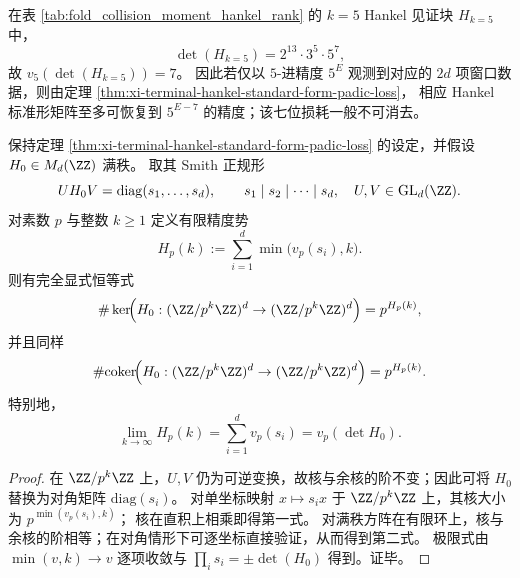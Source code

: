 \begin{corollary}[\texorpdfstring{$p=5$}{p=5} 的刚性阈值：七位损耗的不可消去性]\label{cor:xi-terminal-hankel-standard-form-p5-threshold}
在表 \ref{tab:fold_collision_moment_hankel_rank} 的 \(k=5\) Hankel 见证块 \(H_{k=5}\) 中，
\[
\det(H_{k=5})=2^{13}\cdot 3^5\cdot 5^7,
\]
故 \(v_5(\det(H_{k=5}))=7\)。
因此若仅以 \(5\)-进精度 \(5^E\) 观测到对应的 \(2d\) 项窗口数据，则由定理 \ref{thm:xi-terminal-hankel-standard-form-padic-loss}，
相应 Hankel 标准形矩阵至多可恢复到 \(5^{E-7}\) 的精度；该七位损耗一般不可消去。
\end{corollary}

\begin{theorem}\label{thm:xi-hankel-finite-precision-potential-smith-kernel-coker}
保持定理 \ref{thm:xi-terminal-hankel-standard-form-padic-loss} 的设定，并假设 \(H_0\in M_d(\ZZ)\) 满秩。
取其 Smith 正规形
\[
UH_0V=\mathrm{diag}(s_1,\dots,s_d),\qquad
s_1\mid s_2\mid\cdots\mid s_d,\quad U,V\in \mathrm{GL}_d(\ZZ).
\]
对素数 \(p\) 与整数 \(k\ge 1\) 定义有限精度势
\[
H_p(k):=\sum_{i=1}^{d}\min\bigl(v_p(s_i),k\bigr).
\]
则有完全显式恒等式
\[
\#\ker\!\Bigl(H_0:(\ZZ/p^k\ZZ)^d\to(\ZZ/p^k\ZZ)^d\Bigr)=p^{H_p(k)},
\]
并且同样
\[
\#\mathrm{coker}\!\Bigl(H_0:(\ZZ/p^k\ZZ)^d\to(\ZZ/p^k\ZZ)^d\Bigr)=p^{H_p(k)}.
\]
特别地，
\[
\lim_{k\to\infty}H_p(k)=\sum_{i=1}^{d}v_p(s_i)=v_p(\det H_0).
\]
\end{theorem}
\begin{proof}
在 \(\ZZ/p^k\ZZ\) 上，\(U,V\) 仍为可逆变换，故核与余核的阶不变；因此可将 \(H_0\) 替换为对角矩阵 \(\mathrm{diag}(s_i)\)。
对单坐标映射 \(x\mapsto s_ix\) 于 \(\ZZ/p^k\ZZ\) 上，其核大小为 \(p^{\min(v_p(s_i),k)}\)；
核在直积上相乘即得第一式。
对满秩方阵在有限环上，核与余核的阶相等；在对角情形下可逐坐标直接验证，从而得到第二式。
极限式由 \(\min(v,k)\to v\) 逐项收敛与 \(\prod_i s_i=\pm\det(H_0)\) 得到。证毕。
\end{proof}

